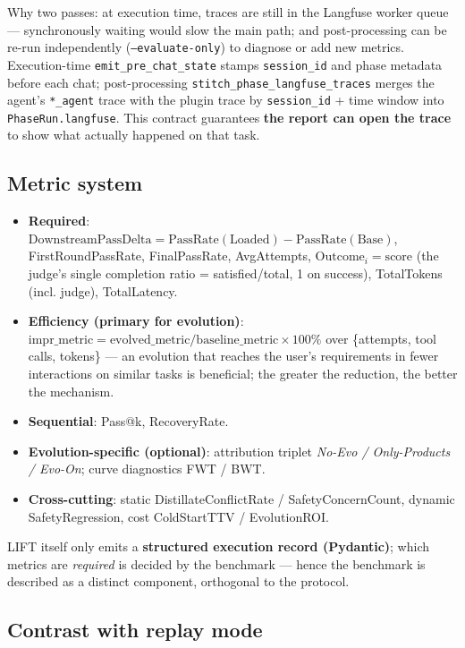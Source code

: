 \documentclass{article}
\begin{document}
Why two passes: at execution time, traces are still in the Langfuse worker queue --- synchronously waiting would slow the main path; and post-processing can be re-run independently (\texttt{--evaluate-only}) to diagnose or add new metrics. Execution-time \texttt{emit\_pre\_chat\_state} stamps \texttt{session\_id} and phase metadata before each chat; post-processing \texttt{stitch\_phase\_langfuse\_traces} merges the agent's \texttt{*\_agent} trace with the plugin trace by \texttt{session\_id} + time window into \texttt{PhaseRun.langfuse}. This contract guarantees \textbf{the report can open the trace} to show what actually happened on that task.

\subsection{Metric system}

\begin{itemize}
\item \textbf{Required}: $\text{DownstreamPassDelta} = \text{PassRate}(\text{Loaded}) - \text{PassRate}(\text{Base})$, FirstRoundPassRate, FinalPassRate, AvgAttempts, $\text{Outcome}_i = \text{score}$ (the judge's single completion ratio = satisfied/total, 1 on success), TotalTokens (incl. judge), TotalLatency.
\item \textbf{Efficiency (primary for evolution)}: $\text{impr\_metric} = \text{evolved\_metric} / \text{baseline\_metric} \times 100\%$ over \{attempts, tool calls, tokens\} --- an evolution that reaches the user's requirements in fewer interactions on similar tasks is beneficial; the greater the reduction, the better the mechanism.
\item \textbf{Sequential}: Pass@k, RecoveryRate.
\item \textbf{Evolution-specific (optional)}: attribution triplet \emph{No-Evo / Only-Products / Evo-On}; curve diagnostics FWT / BWT.
\item \textbf{Cross-cutting}: static DistillateConflictRate / SafetyConcernCount, dynamic SafetyRegression, cost ColdStartTTV / EvolutionROI.
\end{itemize}

LIFT itself only emits a \textbf{structured execution record (Pydantic)}; which metrics are \emph{required} is decided by the benchmark --- hence the benchmark is described as a distinct component, orthogonal to the protocol.

\subsection{Contrast with replay mode}
\end{document}
